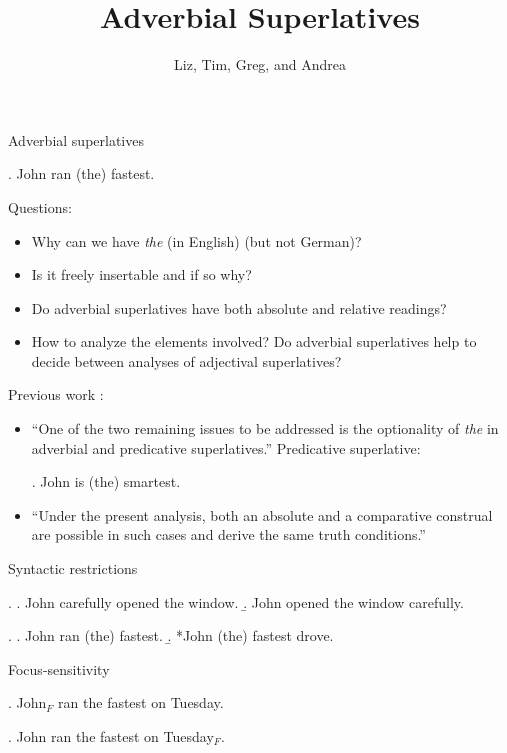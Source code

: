 \documentclass[xcolor=dvipsnames]{beamer}
\title{Adverbial Superlatives}
\author[Comparatives Group]{Liz, Tim, Greg, and Andrea}
\institute{SIASSI Summer Institute 2015}
\begin{document}
\frame{\titlepage}



\begin{frame}{Adverbial superlatives}

\ex. John ran (the) fastest.

Questions:
\begin{itemize}
\item Why can we have {\em the} (in English) (but not German)? 
\item Is it freely insertable and if so why?
\item Do adverbial superlatives have both absolute and relative
  readings?
\item How to analyze the elements involved? Do adverbial superlatives
  help to decide between analyses of adjectival superlatives?
\end{itemize}
\end{frame}

\begin{frame}{Previous work}
\citet{krasikova:2012}:

\begin{itemize}
\item ``One of the two remaining issues to be addressed is the
  optionality of {\em the} in adverbial and predicative
  superlatives.'' Predicative superlative:

\ex. John is (the) smartest.

\item ``Under the present analysis, both an absolute and a
  comparative construal are possible in such cases and derive the same
  truth conditions.''
\end{itemize}

\end{frame}


\begin{frame}{Syntactic restrictions}

\ex.
\a. John carefully opened the window.
\b. John opened the window carefully.

\ex.
\a. John ran (the) fastest.
\b. *John (the) fastest drove.

\end{frame}


\begin{frame}{Focus-sensitivity}


\ex. John$_F$ ran the fastest on Tuesday.

\ex. John ran the fastest on Tuesday$_F$.

\end{frame}
\end{document}
